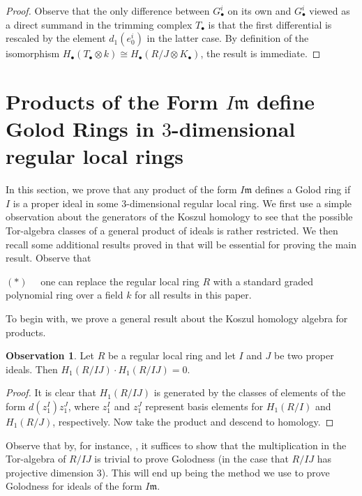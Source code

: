 \documentclass[10pt]{amsart}
\theoremstyle{definition}
\newtheorem{obs}[theorem]{Observation}
\theoremstyle{remark}
\newtheorem{the context}[theorem]{The Context}
\numberwithin{equation}{theorem}
\numberwithin{equation}{section}
\newcommand{\ideal}[1]{\mathfrak{#1}}
\newcommand{\m}{\ideal{m}}
\begin{document}
\begin{proof}
Observe that the only difference between $G_\bullet^i$ on its own and $G_\bullet^i$ viewed as a direct summand in the trimming complex $T_\bullet$ is that the first differential is rescaled by the element $d_1 (e_0^i)$ in the latter case. By definition of the isomorphism $H_\bullet (T_\bullet \otimes k) \cong H_\bullet (R/J \otimes K_\bullet)$, the result is immediate.
\end{proof}






\section{Products of the Form $I \m$ define Golod Rings in $3$-dimensional regular local rings}\label{sec:ofFormIm}

In this section, we prove that any product of the form $I \m$ defines a Golod ring if $I$ is a proper ideal in some $3$-dimensional regular local ring. We first use a simple observation about the generators of the Koszul homology to see that the possible Tor-algebra classes of a general product of ideals is rather restricted. We then recall some additional results proved in \cite{vandebogert2020dg} that will be essential for proving the main result. Observe that
\begin{center}
    $(*) \quad$ one can replace the regular local ring $R$ with a standard graded polynomial ring over a field $k$ for all results in this paper.
\end{center}
To begin with, we prove a general result about the Koszul homology algebra for products. 



\begin{obs}\label{obs:trivialDeg1}
Let $R$ be a regular local ring and let $I$ and $J$ be two proper ideals. Then $H_1 (R/IJ) \cdot H_1 (R/IJ) = 0$.
\end{obs}

\begin{proof}
It is clear that $H_1 (R/IJ)$ is generated by the classes of elements of the form $d(z_1^I) z_1^J$, where $z_1^I$ and $z_1^J$ represent basis elements for $H_1 (R/I)$ and $H_1 (R/J)$, respectively. Now take the product and descend to homology. 
\end{proof}

Observe that by, for instance, \cite[Proposition 5.2.4]{avramov1998infinite}, it suffices to show that the multiplication in the Tor-algebra of $R/IJ$ is trivial to prove Golodness (in the case that $R / IJ$ has projective dimension $3$). This will end up being the method we use to prove Golodness for ideals of the form $I \m$.
\end{document}
